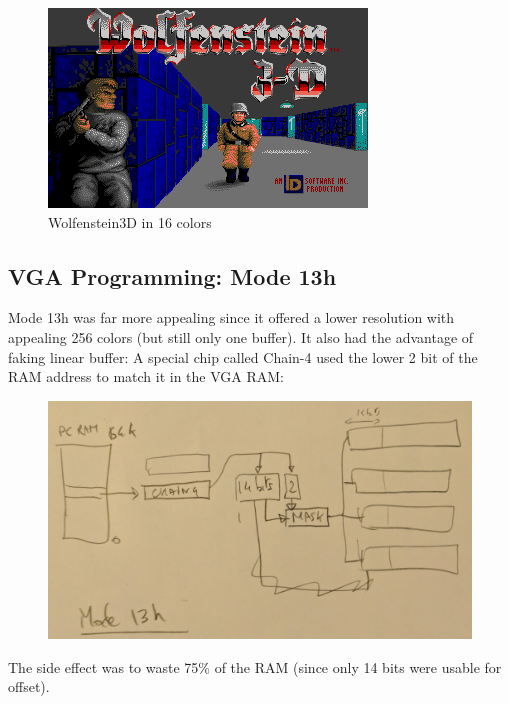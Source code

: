 \documentclass[book.tex]{subfiles}
\begin{document}
 \begin{figure}[H]
\centering
 \includegraphics[width=\textwidth]{imgs/wolf3d_ega.png}
\caption{Wolfenstein3D in 16 colors}
\end{figure}





 
  \subsection{VGA Programming: Mode 13h}
  Mode 13h was far more appealing since it offered a lower resolution with appealing 256 colors (but still only one buffer). It also had the advantage of faking linear buffer: A special chip called Chain-4 used the lower 2 bit of the RAM address to match it in the VGA RAM:\\
  \par
 \begin{figure}[H]
\centering
      \includegraphics[width=\textwidth]{imgs/mode_13h.png}
\end{figure}
\par
The side effect was to waste 75\% of the RAM (since only 14 bits were usable for offset).\\
\end{document}
